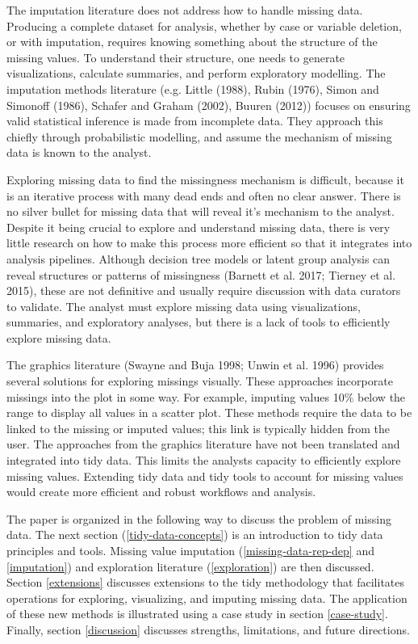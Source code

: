 \documentclass[]{article}
\theoremstyle{definition}
\theoremstyle{definition}
\theoremstyle{definition}
\theoremstyle{remark}
\begin{document}
The imputation literature does not address how to handle missing data.
Producing a complete dataset for analysis, whether by case or variable
deletion, or with imputation, requires knowing something about the
structure of the missing values. To understand their structure, one
needs to generate visualizations, calculate summaries, and perform
exploratory modelling. The imputation methods literature (e.g. Little
(1988), Rubin (1976), Simon and Simonoff (1986), Schafer and Graham
(2002), Buuren (2012)) focuses on ensuring valid statistical inference
is made from incomplete data. They approach this chiefly through
probabilistic modelling, and assume the mechanism of missing data is
known to the analyst.

Exploring missing data to find the missingness mechanism is difficult,
because it is an iterative process with many dead ends and often no
clear answer. There is no silver bullet for missing data that will
reveal it's mechanism to the analyst. Despite it being crucial to
explore and understand missing data, there is very little research on
how to make this process more efficient so that it integrates into
analysis pipelines. Although decision tree models or latent group
analysis can reveal structures or patterns of missingness (Barnett et
al. 2017; Tierney et al. 2015), these are not definitive and usually
require discussion with data curators to validate. The analyst must
explore missing data using visualizations, summaries, and exploratory
analyses, but there is a lack of tools to efficiently explore missing
data.

The graphics literature (Swayne and Buja 1998; Unwin et al. 1996)
provides several solutions for exploring missings visually. These
approaches incorporate missings into the plot in some way. For example,
imputing values 10\% below the range to display all values in a scatter
plot. These methods require the data to be linked to the missing or
imputed values; this link is typically hidden from the user. The
approaches from the graphics literature have not been translated and
integrated into tidy data. This limits the analysts capacity to
efficiently explore missing values. Extending tidy data and tidy tools
to account for missing values would create more efficient and robust
workflows and analysis.

The paper is organized in the following way to discuss the problem of
missing data. The next section (\ref{tidy-data-concepts}) is an
introduction to tidy data principles and tools. Missing value imputation
(\ref{missing-data-rep-dep} and \ref{imputation}) and exploration
literature (\ref{exploration}) are then discussed. Section
\ref{extensions} discusses extensions to the tidy methodology that
facilitates operations for exploring, visualizing, and imputing missing
data. The application of these new methods is illustrated using a case
study in section \ref{case-study}. Finally, section \ref{discussion}
discusses strengths, limitations, and future directions.
\end{document}
